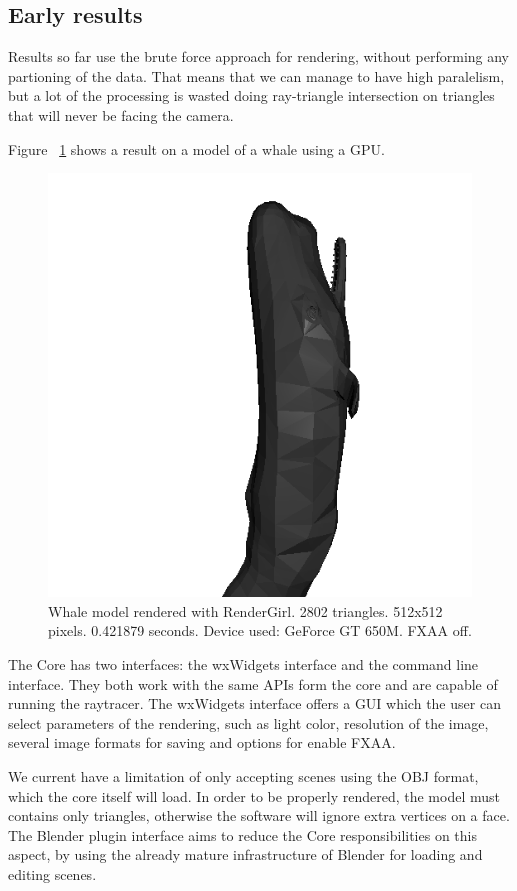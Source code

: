 \documentclass[a4paper]{sbgames}               %
\begin{document}
\subsection{Early results}
\label{sec:conclusion}

Results so far use the brute force approach for rendering, without
performing any partioning of the data. That means that we can manage
to have high paralelism, but a lot of the processing is wasted doing
ray-triangle intersection on triangles that will never be facing the
camera.

Figure ~\ref{fig:result1} shows a result on a model of a whale using a
GPU.

\begin{figure}
  \centering
  \includegraphics[width=0.8\linewidth]{render.png}
  \caption{Whale model rendered with RenderGirl. 2802 triangles.
    512x512 pixels. 0.421879 seconds. Device used: GeForce GT 650M. FXAA
    off.}
 \label{fig:result1}
\end{figure}

The Core has two interfaces: the wxWidgets interface and the command
line interface. They both work with the same APIs form the core and
are capable of running the raytracer. The wxWidgets interface offers a
GUI which the user can select parameters of the rendering, such as
light color, resolution of the image, several image formats for saving
and options for enable FXAA.

We current have a limitation of only accepting scenes using the OBJ
format, which the core itself will load. In order to be properly
rendered, the model must contains only triangles, otherwise the
software will ignore extra vertices on a face. The Blender plugin
interface aims to reduce the Core responsibilities on this aspect, by
using the already mature infrastructure of Blender for loading and
editing scenes.
\end{document}
